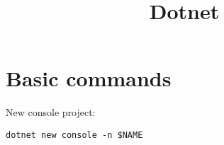 


\title{Dotnet}


\date{}


\maketitle

\justify

\renewcommand{\abstractname}{}

\begin{abstract}

\end{abstract}



\section*{Basic commands}

New console project: 

\texttt{dotnet new console -n \$NAME}






%
%



